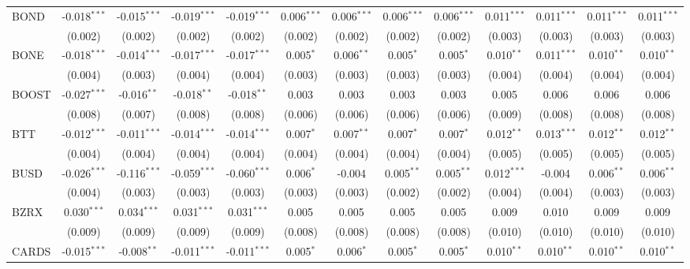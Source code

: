 \begin{table}[!htbp]
\begin{tabular}{@{\extracolsep{5pt}}lcccccccccccc}
 BOND & -0.018$^{***}$ & -0.015$^{***}$ & -0.019$^{***}$ & -0.019$^{***}$ & 0.006$^{***}$ & 0.006$^{***}$ & 0.006$^{***}$ & 0.006$^{***}$ & 0.011$^{***}$ & 0.011$^{***}$ & 0.011$^{***}$ & 0.011$^{***}$ \\
  & (0.002) & (0.002) & (0.002) & (0.002) & (0.002) & (0.002) & (0.002) & (0.002) & (0.003) & (0.003) & (0.003) & (0.003) \\
 BONE & -0.018$^{***}$ & -0.014$^{***}$ & -0.017$^{***}$ & -0.017$^{***}$ & 0.005$^{*}$ & 0.006$^{**}$ & 0.005$^{*}$ & 0.005$^{*}$ & 0.010$^{**}$ & 0.011$^{***}$ & 0.010$^{**}$ & 0.010$^{**}$ \\
  & (0.004) & (0.003) & (0.004) & (0.004) & (0.003) & (0.003) & (0.003) & (0.003) & (0.004) & (0.004) & (0.004) & (0.004) \\
 BOOST & -0.027$^{***}$ & -0.016$^{**}$ & -0.018$^{**}$ & -0.018$^{**}$ & 0.003$^{}$ & 0.003$^{}$ & 0.003$^{}$ & 0.003$^{}$ & 0.005$^{}$ & 0.006$^{}$ & 0.006$^{}$ & 0.006$^{}$ \\
  & (0.008) & (0.007) & (0.008) & (0.008) & (0.006) & (0.006) & (0.006) & (0.006) & (0.009) & (0.008) & (0.008) & (0.008) \\
 BTT & -0.012$^{***}$ & -0.011$^{***}$ & -0.014$^{***}$ & -0.014$^{***}$ & 0.007$^{*}$ & 0.007$^{**}$ & 0.007$^{*}$ & 0.007$^{*}$ & 0.012$^{**}$ & 0.013$^{***}$ & 0.012$^{**}$ & 0.012$^{**}$ \\
  & (0.004) & (0.004) & (0.004) & (0.004) & (0.004) & (0.004) & (0.004) & (0.004) & (0.005) & (0.005) & (0.005) & (0.005) \\
 BUSD & -0.026$^{***}$ & -0.116$^{***}$ & -0.059$^{***}$ & -0.060$^{***}$ & 0.006$^{*}$ & -0.004$^{}$ & 0.005$^{**}$ & 0.005$^{**}$ & 0.012$^{***}$ & -0.004$^{}$ & 0.006$^{**}$ & 0.006$^{**}$ \\
  & (0.004) & (0.003) & (0.003) & (0.003) & (0.003) & (0.003) & (0.002) & (0.002) & (0.004) & (0.004) & (0.003) & (0.003) \\
 BZRX & 0.030$^{***}$ & 0.034$^{***}$ & 0.031$^{***}$ & 0.031$^{***}$ & 0.005$^{}$ & 0.005$^{}$ & 0.005$^{}$ & 0.005$^{}$ & 0.009$^{}$ & 0.010$^{}$ & 0.009$^{}$ & 0.009$^{}$ \\
  & (0.009) & (0.009) & (0.009) & (0.009) & (0.008) & (0.008) & (0.008) & (0.008) & (0.010) & (0.010) & (0.010) & (0.010) \\
 CARDS & -0.015$^{***}$ & -0.008$^{**}$ & -0.011$^{***}$ & -0.011$^{***}$ & 0.005$^{*}$ & 0.006$^{*}$ & 0.005$^{*}$ & 0.005$^{*}$ & 0.010$^{**}$ & 0.010$^{**}$ & 0.010$^{**}$ & 0.010$^{**}$ \\

\end{tabular}
\end{table}
